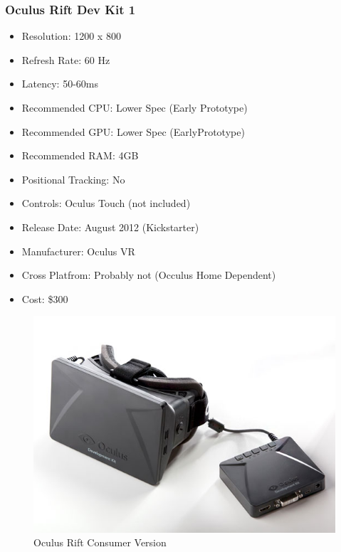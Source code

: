\documentclass[a4paper,10pt]{article}
\begin{document}
\subsubsection{Oculus Rift Dev Kit 1}
\begin{itemize}
 \item Resolution: 1200 x 800
 \item Refresh Rate: 60 Hz
 \item Latency: 50-60ms
 \item Recommended CPU: Lower Spec (Early Prototype)
 \item Recommended GPU: Lower Spec (EarlyPrototype)
 \item Recommended RAM: 4GB
 \item Positional Tracking: No
 \item Controls: Oculus Touch (not included)
 \item Release Date: August 2012 (Kickstarter)
 \item Manufacturer: Oculus VR
 \item Cross Platfrom: Probably not (Occulus Home Dependent)
 \item Cost: \$300
\end{itemize}
	\begin{figure}[H]
	\includegraphics[width=\linewidth,height=\paperheight,keepaspectratio]{dk1.jpg}
	\caption{Oculus Rift Consumer Version}
	\label{fig:Riftdk1Img}
	\end{figure}
	\pagebreak
\end{document}
